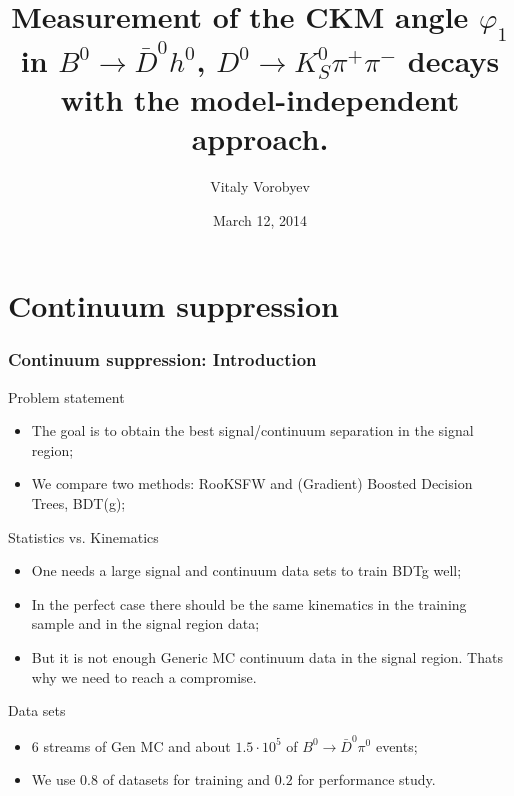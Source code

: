 \documentclass[10 pt,compress,mathserif]{beamer}
\newcommand{\dkspp}{\ensuremath{D^0\to K_S^0\pi^+\pi^-}\xspace}
\newcommand{\bdh}{\ensuremath{B^0\to \bar D^0h^0}\xspace}
\newcommand{\bdpi}{\ensuremath{B^0\to \bar D^0\pi^0}\xspace}
\begin{document}
\title{Measurement of the CKM angle $\varphi_1$ in \bdh, \dkspp decays with the model-independent approach.}
\author{Vitaly Vorobyev}
\date{March 12, 2014}
\frame{\titlepage}


\section{Continuum suppression}
\frame{\tableofcontents[current]}
\begin{frame}[containsverbatim]
 \frametitle{Continuum suppression: Introduction}
 \begin{small}
  \begin{block}{Problem statement}
  \begin{itemize}
   \item The goal is to obtain the best signal/continuum separation in the signal region;
   \item We compare two methods: RooKSFW and (Gradient) Boosted Decision Trees, BDT(g);
   \end{itemize}
  \end{block}
  \begin{block}{Statistics vs. Kinematics}
  \begin{itemize}
   \item One needs a large signal and continuum data sets to train BDTg well;
   \item In the perfect case there should be the same kinematics in the training sample and in the signal region data;
   \item But it is not enough Generic MC continuum data in the signal region. Thats why we need to reach a compromise.
  \end{itemize}
  \end{block}
  \begin{block}{Data sets}
   \begin{itemize}
    \item $6$ streams of Gen MC and about $1.5\cdot 10^5$ of \bdpi events;
    \item We use $0.8$ of datasets for training and $0.2$ for performance study.
   \end{itemize}
  \end{block}
 \end{small}
\end{frame}
\end{document}
